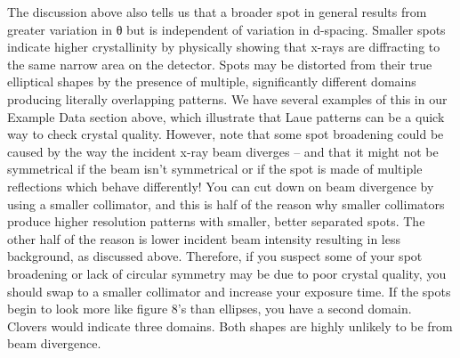 The discussion above also tells us that a broader spot in general results from greater variation in θ but is independent of variation in d-spacing. Smaller spots indicate higher crystallinity by physically showing that x-rays are diffracting to the same narrow area on the detector. Spots may be distorted from their true elliptical shapes by the presence of multiple, significantly different domains producing literally overlapping patterns. We have several examples of this in our Example Data section above, which illustrate that Laue patterns can be a quick way to check crystal quality. However, note that some spot broadening could be caused by the way the incident x-ray beam diverges – and that it might not be symmetrical if the beam isn’t symmetrical or if the spot is made of multiple reflections which behave differently!
You can cut down on beam divergence by using a smaller collimator, and this is half of the reason why smaller collimators produce higher resolution patterns with smaller, better separated spots. The other half of the reason is lower incident beam intensity resulting in less background, as discussed above.
Therefore, if you suspect some of your spot broadening or lack of circular symmetry may be due to poor crystal quality, you should swap to a smaller collimator and increase your exposure time. If the spots begin to look more like figure 8’s than ellipses, you have a second domain. Clovers would indicate three domains. Both shapes are highly unlikely to be from beam divergence. 
